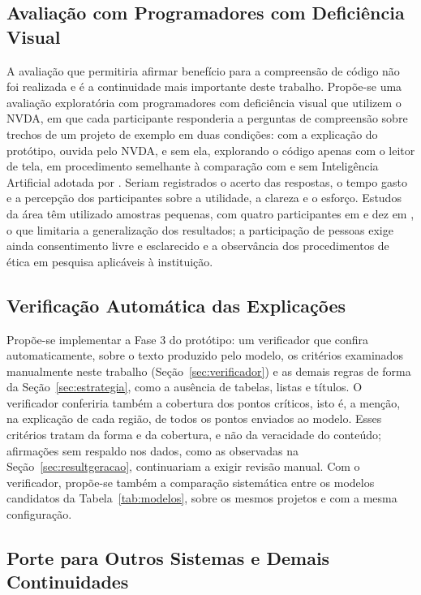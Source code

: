 \documentclass[
    12pt,                   %
    openright,              %
    oneside,                %
    a4paper,                %
    sumario=tradicional,    %
    english,                %
    brazil,                 %
    ]{abntex2}
\begin{document}
\subsection{Avaliação com Programadores com Deficiência Visual}\label{sec:usuarios}

A avaliação que permitiria afirmar benefício para a compreensão de código não foi realizada e é a continuidade mais importante deste trabalho. Propõe-se uma avaliação exploratória com programadores com deficiência visual que utilizem o NVDA, em que cada participante responderia a perguntas de compreensão sobre trechos de um projeto de exemplo em duas condições: com a explicação do protótipo, ouvida pelo NVDA, e sem ela, explorando o código apenas com o leitor de tela, em procedimento semelhante à comparação com e sem Inteligência Artificial adotada por \textcite{latinoware34224}. Seriam registrados o acerto das respostas, o tempo gasto e a percepção dos participantes sobre a utilidade, a clareza e o esforço. Estudos da área têm utilizado amostras pequenas, com quatro participantes em \textcite{latinoware34224} e dez em \textcite{latinoware20457}, o que limitaria a generalização dos resultados; a participação de pessoas exige ainda consentimento livre e esclarecido e a observância dos procedimentos de ética em pesquisa aplicáveis à instituição.

\subsection{Verificação Automática das Explicações}\label{sec:verificacaofutura}

Propõe-se implementar a Fase 3 do protótipo: um verificador que confira automaticamente, sobre o texto produzido pelo modelo, os critérios examinados manualmente neste trabalho (Seção~\ref{sec:verificador}) e as demais regras de forma da Seção~\ref{sec:estrategia}, como a ausência de tabelas, listas e títulos. O verificador conferiria também a cobertura dos pontos críticos, isto é, a menção, na explicação de cada região, de todos os pontos enviados ao modelo. Esses critérios tratam da forma e da cobertura, e não da veracidade do conteúdo; afirmações sem respaldo nos dados, como as observadas na Seção~\ref{sec:resultgeracao}, continuariam a exigir revisão manual. Com o verificador, propõe-se também a comparação sistemática entre os modelos candidatos da Tabela~\ref{tab:modelos}, sobre os mesmos projetos e com a mesma configuração.

\subsection{Porte para Outros Sistemas e Demais Continuidades}
\end{document}
